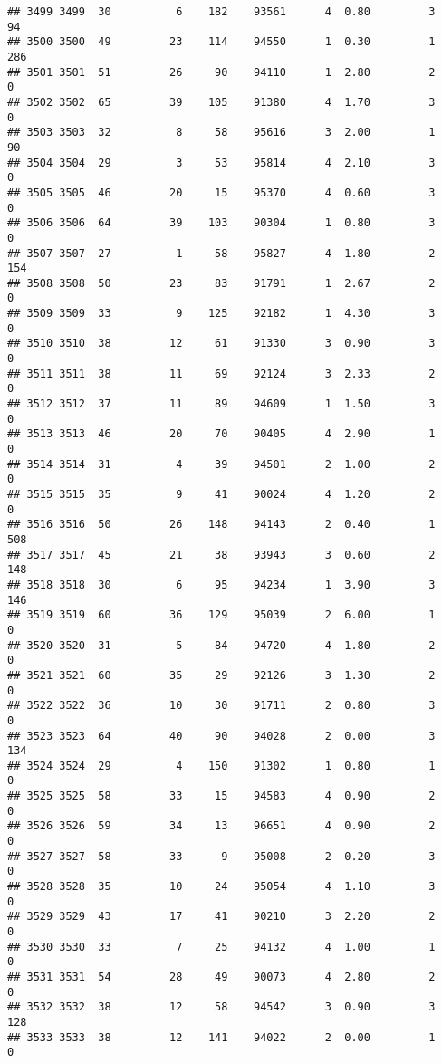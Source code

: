\documentclass[
]{article}
\begin{document}
\begin{verbatim}
## 3499 3499  30          6    182    93561      4  0.80         3       94
## 3500 3500  49         23    114    94550      1  0.30         1      286
## 3501 3501  51         26     90    94110      1  2.80         2        0
## 3502 3502  65         39    105    91380      4  1.70         3        0
## 3503 3503  32          8     58    95616      3  2.00         1       90
## 3504 3504  29          3     53    95814      4  2.10         3        0
## 3505 3505  46         20     15    95370      4  0.60         3        0
## 3506 3506  64         39    103    90304      1  0.80         3        0
## 3507 3507  27          1     58    95827      4  1.80         2      154
## 3508 3508  50         23     83    91791      1  2.67         2        0
## 3509 3509  33          9    125    92182      1  4.30         3        0
## 3510 3510  38         12     61    91330      3  0.90         3        0
## 3511 3511  38         11     69    92124      3  2.33         2        0
## 3512 3512  37         11     89    94609      1  1.50         3        0
## 3513 3513  46         20     70    90405      4  2.90         1        0
## 3514 3514  31          4     39    94501      2  1.00         2        0
## 3515 3515  35          9     41    90024      4  1.20         2        0
## 3516 3516  50         26    148    94143      2  0.40         1      508
## 3517 3517  45         21     38    93943      3  0.60         2      148
## 3518 3518  30          6     95    94234      1  3.90         3      146
## 3519 3519  60         36    129    95039      2  6.00         1        0
## 3520 3520  31          5     84    94720      4  1.80         2        0
## 3521 3521  60         35     29    92126      3  1.30         2        0
## 3522 3522  36         10     30    91711      2  0.80         3        0
## 3523 3523  64         40     90    94028      2  0.00         3      134
## 3524 3524  29          4    150    91302      1  0.80         1        0
## 3525 3525  58         33     15    94583      4  0.90         2        0
## 3526 3526  59         34     13    96651      4  0.90         2        0
## 3527 3527  58         33      9    95008      2  0.20         3        0
## 3528 3528  35         10     24    95054      4  1.10         3        0
## 3529 3529  43         17     41    90210      3  2.20         2        0
## 3530 3530  33          7     25    94132      4  1.00         1        0
## 3531 3531  54         28     49    90073      4  2.80         2        0
## 3532 3532  38         12     58    94542      3  0.90         3      128
## 3533 3533  38         12    141    94022      2  0.00         1        0

\end{verbatim}
\end{document}
